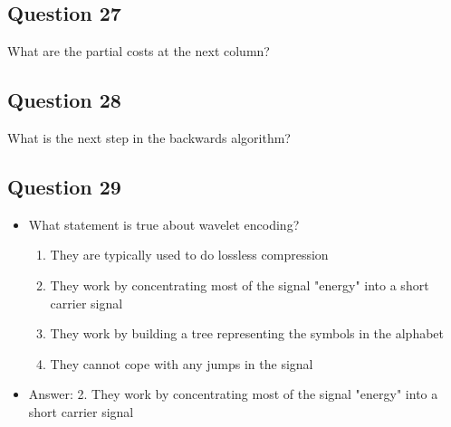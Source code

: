 \begin{slide}
\section[-1]{Question 27}

\pb
  What are the partial costs at the next column?\pauseh
\pauseh{}  \begin{center}
  \pause
  \end{center}
\end{slide}

\begin{slide}
\section[-1]{Question 28}

\pb
  What is the next step in the backwards algorithm?\pauseh
\pauseh{}  \begin{center}
  \pause
  \end{center}
\end{slide}

\begin{slide}
\section[-1]{Question 29}

\begin{PauseHighLight}
  \begin{itemize}
  \item What statement is true about wavelet encoding?
    \begin{enumerate}
    \item They are typically used to do lossless compression
    \item They work by concentrating most of the signal "energy" into a short carrier signal
    \item They work by building a tree representing the symbols in the alphabet
    \item They cannot cope with any jumps in the signal\pause
    \end{enumerate}
  \item Answer: 2. They work by concentrating most of the signal "energy" into a short carrier signal\pauseb
  \end{itemize}
\end{PauseHighLight}
\end{slide}

